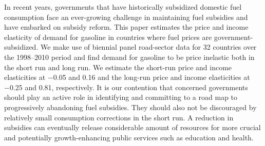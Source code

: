 In recent years, governments that have historically subsidized domestic fuel consumption face an ever-growing challenge in maintaining fuel subsidies and have embarked on subsidy reform. This paper estimates the price and income elasticity of demand for gasoline in countries where fuel prices are government-subsidized. We make use of biennial panel road-sector data for 32 countries over the 1998–2010 period and find demand for gasoline to be price inelastic both in the short run and long run. We estimate the short-run price and income elasticities at −0.05 and 0.16 and the long-run price and income elasticities at −0.25 and 0.81, respectively. It is our contention that concerned governments should play an active role in identifying and committing to a road map to progressively abandoning fuel subsidies. They should also not be discouraged by relatively small consumption corrections in the short run. A reduction in subsidies can eventually release considerable amount of resources for more crucial and potentially growth-enhancing public services such as education and health.